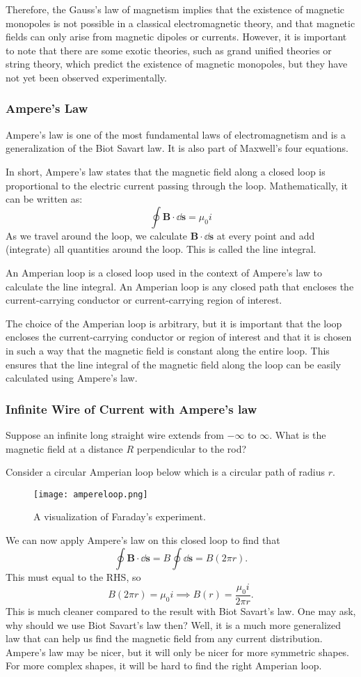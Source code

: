 \documentclass[12pt]{article}
\let\vec\mathbf
\begin{document}
Therefore, the Gauss's law of magnetism implies that the existence of magnetic monopoles is not possible in a classical electromagnetic theory, and that magnetic fields can only arise from magnetic dipoles or currents. However, it is important to note that there are some exotic theories, such as grand unified theories or string theory, which predict the existence of magnetic monopoles, but they have not yet been observed experimentally.
\subsubsection{Ampere's Law}
Ampere's law is one of the most fundamental laws of electromagnetism and is a generalization of the Biot Savart law. It is also part of Maxwell's four equations. 
\begin{idea}
In short, Ampere's law states that the magnetic field along a closed loop is proportional to the electric current passing through the loop. Mathematically, it can be written as:
\[\oint \vec B \cdot \dd \vec s = \mu_0 i\]
As we travel around the loop, we calculate $\vec B\cdot \dd \vec s$ at every point and add (integrate) all quantities around the loop. This is called the line integral. 
\end{idea}
An Amperian loop is a closed loop used in the context of Ampere's law to calculate the line integral. An Amperian loop is any closed path that encloses the current-carrying conductor or current-carrying region of interest.

The choice of the Amperian loop is arbitrary, but it is important that the loop encloses the current-carrying conductor or region of interest and that it is chosen in such a way that the magnetic field is constant along the entire loop. This ensures that the line integral of the magnetic field along the loop can be easily calculated using Ampere's law.
\subsubsection{Infinite Wire of Current with Ampere's law}
\begin{prob}
Suppose an infinite long straight wire extends from $-\infty$ to $\infty$. What is the magnetic field at a distance $R$ perpendicular to the rod? 
\end{prob}
Consider a circular Amperian loop below which is a circular path of radius $r$.
    \begin{figure}[H]
  \centering
      \texttt{[image: ampereloop.png]}
      \caption{A visualization of Faraday's experiment.}
  \end{figure}
  We can now apply Ampere's law on this closed loop to find that 
  \[\oint \vec B \cdot \dd \vec s = B \oint \dd \vec s = B (2\pi r).\]
  This must equal to the RHS, so 
  \[B(2\pi r) = \mu_0 i\implies B(r) = \frac{\mu_0 i}{2\pi r}.\]
  This is much cleaner compared to the result with Biot Savart's law. One may ask, why should we use Biot Savart's law then? Well, it is a much more generalized law that can help us find the magnetic field from any current distribution. Ampere's law may be nicer, but it will only be nicer for more symmetric shapes. For more complex shapes, it will be hard to find the right Amperian loop. 
\end{document}
